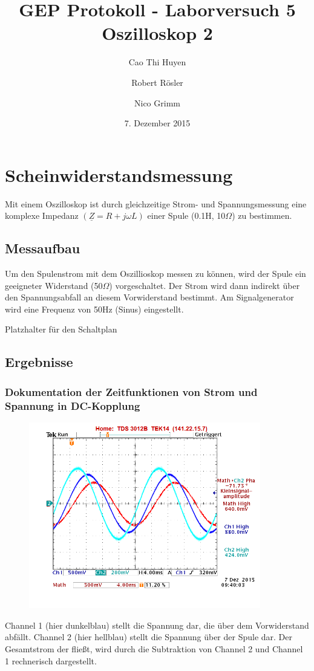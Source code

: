 \documentclass[11pt,a4paper,titlepage]{article}
\begin{document}
\title{GEP Protokoll - Laborversuch 5\\
Oszilloskop 2}
\author{Cao Thi Huyen \and Robert R\"osler \and Nico Grimm}
\date{7. Dezember 2015}
\maketitle
\section{Scheinwiderstandsmessung}
Mit einem Oszilloskop ist durch gleichzeitige Strom- und Spannungsmessung eine komplexe Impedanz \((\underline{Z}=R+j\omega L)\) einer Spule (0.1H, 10$\Omega$) zu bestimmen.
\subsection{Messaufbau}
Um den Spulenstrom mit dem Oszillioskop messen zu k\"onnen, wird der Spule ein geeigneter Widerstand (50$\Omega$) vorgeschaltet. Der Strom wird dann indirekt \"uber den Spannungsabfall an diesem Vorwiderstand bestimmt. Am Signalgenerator wird eine Frequenz von 50Hz (Sinus) eingestellt.
\begin{center}
Platzhalter f\"ur den Schaltplan
\end{center}
\subsection{Ergebnisse}
\subsubsection{Dokumentation der Zeitfunktionen von Strom und Spannung in DC-Kopplung}
\begin{figure}[h!]
\label{fig:aufg1}
\begin{center}
\includegraphics[width=0.9\textwidth]{5_1_1}
\end{center}
\end{figure}
Channel 1 (hier dunkelblau) stellt die Spannung dar, die \"uber dem Vorwiderstand abf\"allt. Channel 2 (hier hellblau) stellt die Spannung \"uber der Spule dar. Der Gesamtstrom der flie\ss{}t, wird durch die Subtraktion von Channel 2 und Channel 1 rechnerisch dargestellt.
\newpage
\end{document}
